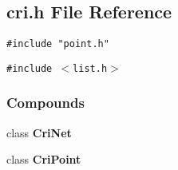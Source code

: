 \subsection{cri.h File Reference}
\label{cri.h}
{\tt \#include "point.h"}\par
{\tt \#include $<$list.h$>$}\par
\subsubsection*{Compounds}
\begin{CompactItemize}
\item 
class {\bf Cri\-Net}
\item 
class {\bf Cri\-Point}
\end{CompactItemize}
